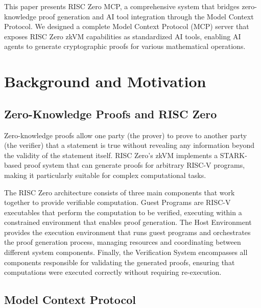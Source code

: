 \documentclass[11pt]{article}
\begin{document}
This paper presents RISC Zero MCP, a comprehensive system that bridges zero-knowledge proof generation and AI tool integration through the Model Context Protocol. We designed a complete Model Context Protocol (MCP) server that exposes RISC Zero zkVM capabilities as standardized AI tools, enabling AI agents to generate cryptographic proofs for various mathematical operations.

\section{Background and Motivation}
\label{sec:background}

\subsection{Zero-Knowledge Proofs and RISC Zero}

Zero-knowledge proofs allow one party (the prover) to prove to another party (the verifier) that a statement is true without revealing any information beyond the validity of the statement itself. RISC Zero's zkVM implements a STARK-based proof system that can generate proofs for arbitrary RISC-V programs, making it particularly suitable for complex computational tasks.

The RISC Zero architecture consists of three main components that work together to provide verifiable computation. Guest Programs are RISC-V executables that perform the computation to be verified, executing within a constrained environment that enables proof generation. The Host Environment provides the execution environment that runs guest programs and orchestrates the proof generation process, managing resources and coordinating between different system components. Finally, the Verification System encompasses all components responsible for validating the generated proofs, ensuring that computations were executed correctly without requiring re-execution.

\subsection{Model Context Protocol}
\end{document}
